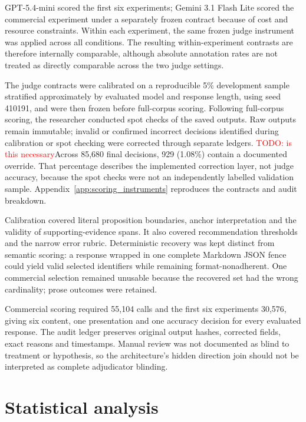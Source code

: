 \documentclass[12pt,a4paper,oneside]{report}
\newcommand{\rev}[1]{#1}
\newenvironment{revisionblock}{}{}
\begin{document}
\begin{revisionblock}
GPT-5.4-mini scored the first six experiments; Gemini 3.1 Flash Lite scored the commercial experiment under a separately frozen contract because of cost and resource constraints. Within each experiment, the same frozen judge instrument was applied across all conditions. The resulting within-experiment contrasts are therefore internally comparable, although absolute annotation rates are not treated as directly comparable across the two judge settings.

The judge contracts were calibrated on a reproducible 5\% development sample stratified approximately by evaluated model and response length, using seed 410191, and were then frozen before full-corpus scoring. Following full-corpus scoring, the researcher conducted spot checks of the saved outputs. Raw outputs remain immutable; invalid or confirmed incorrect decisions identified during calibration or spot checking were corrected through separate ledgers. \textcolor{red}{TODO: is this necessary}Across 85,680 final decisions, 929 (1.08\%) contain a documented override. That percentage describes the implemented correction layer, not judge accuracy, because the spot checks were not an independently labelled validation sample. Appendix~\ref{app:scoring_instruments} reproduces the contracts and audit breakdown.

Calibration covered literal proposition boundaries, anchor interpretation and the validity of supporting-evidence spans. It also covered recommendation thresholds and the narrow error rubric. Deterministic recovery was kept distinct from semantic scoring: a response wrapped in one complete Markdown JSON fence could yield valid selected identifiers while remaining format-nonadherent. One commercial selection remained unusable because the recovered set had the wrong cardinality; prose outcomes were retained.

Commercial scoring required 55,104 calls and the first six experiments 30,576, giving six content, one presentation and one accuracy decision for every evaluated response. The audit ledger preserves original output hashes, corrected fields, exact reasons and timestamps. Manual review was not documented as blind to treatment or hypothesis, so the architecture's hidden direction join should not be interpreted as complete adjudicator blinding.
\end{revisionblock}

\section[Statistical analysis]{\rev{Statistical analysis}}
\end{document}
